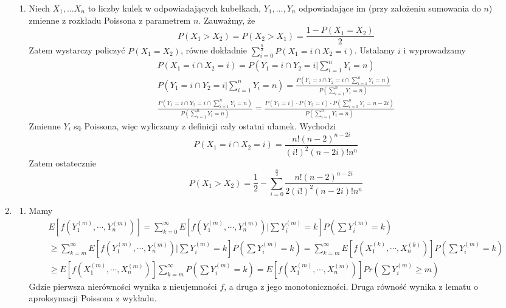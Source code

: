 \documentclass{article}
\begin{document}
\begin{enumerate}
\begin{enumerate}
			\item 
			Niech $X_1, \ldots X_n$ to liczby kulek w odpowiadających kubełkach, $Y_1, \ldots, Y_n$ odpowiadające im (przy założeniu sumowania do $n$) zmienne z rozkładu Poissona z parametrem $n$.
			Zauważmy, że
			\[
			P(X_1 > X_2) = P(X_2 > X_1) = \frac{1 - P(X_1 = X_2)}{2}
			\]
			Zatem wystarczy policzyć $P(X_1 = X_2)$, równe dokładnie $\sum_{i=0}^{\frac{n}{2}} P(X_1 = i \cap X_2 = i)$. Ustalamy $i$ i wyprowadzamy
			\begin{gather*}
			P(X_1 = i \cap X_2 = i) = P(Y_1 = i \cap Y_2 = i | \sum_{i=1}^{n} Y_i = n) \\
			P(Y_1 = i \cap Y_2 = i | \sum_{i=1}^{n} Y_i = n) = \frac{P(Y_1 = i\cap Y_2 = i \cap \sum_{i=1}^{n} Y_i = n)}{P(\sum_{i=1}^{n} Y_i = n)} \\
			\frac{P(Y_1 = i\cap Y_2 = i \cap \sum_{i=1}^{n} Y_i = n)}{P(\sum_{i=1}^{n} Y_i = n)} = \frac{P(Y_1 = i) \cdot P(Y_2 = i) \cdot P(\sum_{i=3}^{n} Y_i = n-2i)}{P(\sum_{i=1}^{n} Y_i = n)}
			\end{gather*}
			Zmienne $Y_i$ są Poissona, więc wyliczamy z definicji cały ostatni ułamek. Wychodzi
			\[
			P(X_1 = i \cap X_2 = i) = \frac{n! (n-2)^{n-2i}}{(i!)^2(n-2i)!n^n}
			\]
			Zatem ostatecznie 
			\[
			P(X_1 > X_2) = \frac{1}{2} - \sum_{i=0}^{\frac{n}{2}} \frac{n! (n-2)^{n-2i}}{2(i!)^2(n-2i)!n^n}
			\]
			
		\end{enumerate}
		
		\item 
		\begin{enumerate}
			\item Mamy 
			\begin{gather*}
			E[f(Y_1^{(m)},\cdots,Y_n^{(m)})]
			= \sum_{k=0}^{\infty}E\left[  f(Y_1^{(m)},\cdots,Y_n^{(m)})| \sum Y_i^{(m)} = k \right]
			P\left(\sum Y_i^{(m)} = k\right) \\
			\ge \sum_{k=m}^{\infty}E\left[  f(Y_1^{(m)},\cdots,Y_n^{(m)})| \sum Y_i^{(m)} = k \right]
			P\left(\sum Y_i^{(m)} = k\right) 
			= \sum_{k=m}^{\infty}E\left[  f(X_1^{(k)},\cdots,X_n^{(k)})\right]
			P\left(\sum Y_i^{(m)} = k\right) \\
			\ge E[f(X_1^{(m)},\cdots, X_n^{(m)})]\sum_{k=m}^{\infty}P\left(\sum Y_i^{(m)} = k\right) 
			=  E[f(X_1^{(m)},\cdots, X_n^{(m)})]Pr\left(\sum Y_i^{(m)} \ge m\right)
			\end{gather*}
			Gdzie pierwsza nierówności wynika z nieujemności $f$, a druga z jego monotoniczności. Druga równość wynika z lematu o aproksymacji Poissona z wykładu.
			

\end{enumerate}
\end{enumerate}
\end{document}
